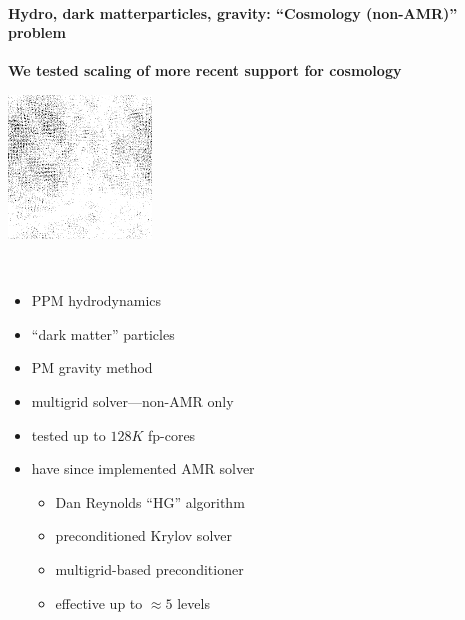 
\begin{frame}[fragile]
 \secframetitle{\ssScaling}
\framesubtitle{Hydro, dark matterparticles, gravity: ``Cosmology (non-AMR)'' problem}

\textbf{We tested scaling of more recent support for cosmology}

\begin{minipage}{1.5in}
  \vspace{0.2in}
  \includegraphics[width=1.5in]{Images/Cosmo/dark-20-normal.png} \\
\end{minipage} \
\begin{minipage}{2.75in}
  \vspace {0.2in}
  \begin{itemize}
  \item PPM hydrodynamics
  \item ``dark matter'' particles
  \item PM gravity method
  \item multigrid solver---non-AMR only
   \item tested up to $128K$ fp-cores
  \item have since implemented AMR solver
    \begin{itemize}
      \item Dan Reynolds ``HG'' algorithm
    \item preconditioned Krylov solver
    \item multigrid-based preconditioner
    \item effective up to $\approx 5$ levels
    \end{itemize}
  \end{itemize}
\end{minipage}
\end{frame}
